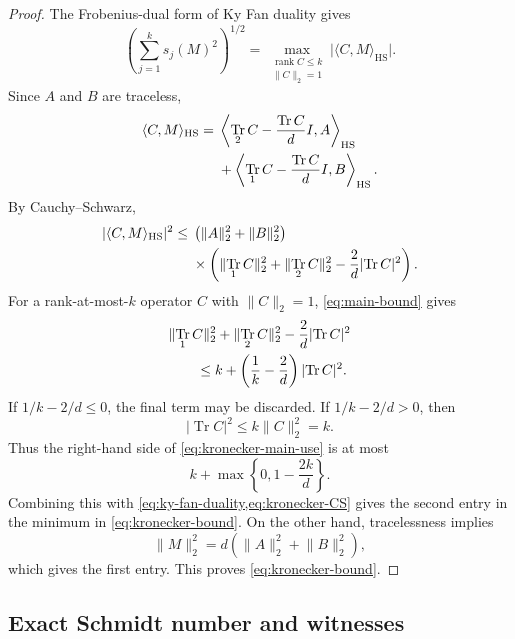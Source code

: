 \documentclass[11pt,reqno]{amsart}
\theoremstyle{remark}
\DeclareMathOperator{\Tr}{Tr}
\DeclareMathOperator{\rank}{rank}
\newcommand{\norm}[1]{\lVert #1\rVert}
\newcommand{\abs}[1]{\lvert #1\rvert}
\begin{document}
\begin{proof}
The Frobenius-dual form of Ky Fan duality gives
\begin{equation}
\label{eq:ky-fan-duality}
    \left(
      \sum_{j=1}^k s_j(M)^2
    \right)^{1/2}
    =
    \max_{\substack{\rank C\le k\\ \norm{C}_2=1}}
    \abs{\langle C,M\rangle_{\mathrm{HS}}}.
\end{equation}
Since $A$ and $B$ are traceless,
\begin{align}
    \langle C,M\rangle_{\mathrm{HS}}
    ={}&
    \left\langle
      \Tr_2C-\frac{\Tr C}{d}I,
      A
    \right\rangle_{\mathrm{HS}}
    \notag\\
    &+
    \left\langle
      \Tr_1C-\frac{\Tr C}{d}I,
      B
    \right\rangle_{\mathrm{HS}}.
\label{eq:kronecker-pairing}
\end{align}
By Cauchy--Schwarz,
\begin{align}
    \abs{\langle C,M\rangle_{\mathrm{HS}}}^2
    \le{}&
    \left(
      \norm{A}_2^2+\norm{B}_2^2
    \right)
    \notag\\
    &\times
    \left(
      \norm{\Tr_1C}_2^2
      +
      \norm{\Tr_2C}_2^2
      -
      \frac2d\abs{\Tr C}^2
    \right).
\label{eq:kronecker-CS}
\end{align}
For a rank-at-most-$k$ operator $C$ with $\norm{C}_2=1$,
\cref{eq:main-bound} gives
\begin{align}
    &
    \norm{\Tr_1C}_2^2
    +
    \norm{\Tr_2C}_2^2
    -
    \frac2d\abs{\Tr C}^2
    \notag\\
    &\qquad
    \le
    k
    +
    \left(
      \frac1k-\frac2d
    \right)\abs{\Tr C}^2.
\label{eq:kronecker-main-use}
\end{align}
If $1/k-2/d\le0$, the final term may be discarded. If
$1/k-2/d>0$, then
\[
    \abs{\Tr C}^2
    \le
    k\norm{C}_2^2
    =
    k.
\]
Thus the right-hand side of
\cref{eq:kronecker-main-use} is at most
\[
    k+\max\left\{
      0,1-\frac{2k}{d}
    \right\}.
\]
Combining this with
\cref{eq:ky-fan-duality,eq:kronecker-CS} gives the second entry in the
minimum in \cref{eq:kronecker-bound}. On the other hand, tracelessness
implies
\[
    \norm{M}_2^2
    =d\left(\norm{A}_2^2+\norm{B}_2^2\right),
\]
which gives the first entry. This proves \cref{eq:kronecker-bound}.
\end{proof}


\subsection{Exact Schmidt number and witnesses}
\end{document}

